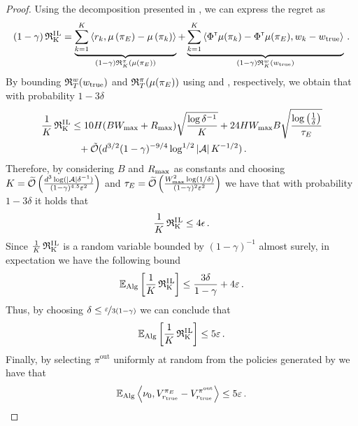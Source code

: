 \begin{proof}
    Using the decomposition presented in , we can express the regret as
    \begin{equation*}
        (1 - \gamma) \operatorname{\mathfrak{R}_K^\mathrm{I\hspace{.05em}L}} = \underbrace{\sum^K_{k=1} \left\langle{r_k},{\mu\left({{\pi_E}}\right) - \mu\left({\pi_k}\right)}\right\rangle}_{(1-\gamma)\mathfrak{R}_K^\pi(\mu\left({{\pi_E}}\right))} + \underbrace{\sum^K_{k=1} \left\langle{\Phi^\mathsf{\scriptscriptstyle T}\mu(\pi_k) - \Phi^\mathsf{\scriptscriptstyle T}\mu({\pi_E})},{w_k - w_{\mathrm{true}}}\right\rangle}_{(1-\gamma)\mathfrak{R}_K^w(w_{\mathrm{true}})} \label{eq:dec}\,.
    \end{equation*}
    By bounding $\mathfrak{R}_T^w(w_{\mathrm{true}})$ and $\mathfrak{R}_T^\pi(\mu({\pi_E}))$ using  and , respectively, we obtain that with probability $1 - 3 \delta$
    \begin{align*}
        \frac{1}{K} \operatorname{\mathfrak{R}_K^\mathrm{I\hspace{.05em}L}} &\leq  10 H (B W_{\max}+R_{\max}) \sqrt{ \frac{\log \delta^{-1}}{K}} + 24 HW_{\max} B \sqrt{\frac{ \log\left({\frac{1}{\delta}}\right)}{\tau_E}} \\&\phantom{=}+ \tilde{\mathcal{O}}(d^{3/2}(1 - \gamma)^{-9/4} \log^{1/2} \left|\mathcal{A}\right| K^{-1/2})\,.
    \end{align*}
    Therefore, by considering $B$ and $R_{\max}$ as constants and choosing $K = \widetilde{\mathcal{O}}\left({\frac{ d^{3} \log (\left|\mathcal{A}\right|\delta^{-1})}{(1 - \gamma)^{4.5}\varepsilon^2}}\right)$ and $\tau_E = \widetilde{\mathcal{O}}\left({\frac{ W_{\max}^2 \log(1/\delta)}{(1 - \gamma)^2\varepsilon^2}}\right)$ we have that with probability $1 - 3 \delta$ it holds that
    \begin{equation*}
        \frac{1}{K} \operatorname{\mathfrak{R}_K^\mathrm{I\hspace{.05em}L}} \leq 4 \epsilon\,.
    \end{equation*}
    Since $\frac{1}{K} \operatorname{\mathfrak{R}_K^\mathrm{I\hspace{.05em}L}}$ is a random variable bounded by $(1-\gamma)^{-1}$ almost surely, in expectation we have the following bound
    \begin{equation*}
        \mathbb{E}_{\mathrm{Alg}} \left[{\frac{1}{K} \operatorname{\mathfrak{R}_K^\mathrm{I\hspace{.05em}L}}}\right] \leq \frac{3 \delta}{1-\gamma} + 4 \varepsilon\,.
    \end{equation*}
    Thus, by choosing $\delta \leq \nicefrac{\varepsilon}{3(1-\gamma)}$ we can conclude that
    \begin{equation*}
        \mathbb{E}_{\mathrm{Alg}} \left[{\frac{1}{K} \operatorname{\mathfrak{R}_K^\mathrm{I\hspace{.05em}L}}}\right] \leq 5 \varepsilon\,.
    \end{equation*}
    Finally, by selecting $\pi^{\mathrm{out}}$ uniformly at random from the policies generated by  
    we have that
    \begin{equation*}
        \mathbb{E}_{\mathrm{Alg}} \left\langle{\nu_0},{V_{r_{\textup{true}}}^{{\pi_E}} - V_{r_{\textup{true}}}^{\pi^{\mathrm{out}}}}\right\rangle \leq 5 \varepsilon\,.
    \end{equation*}
\end{proof}



